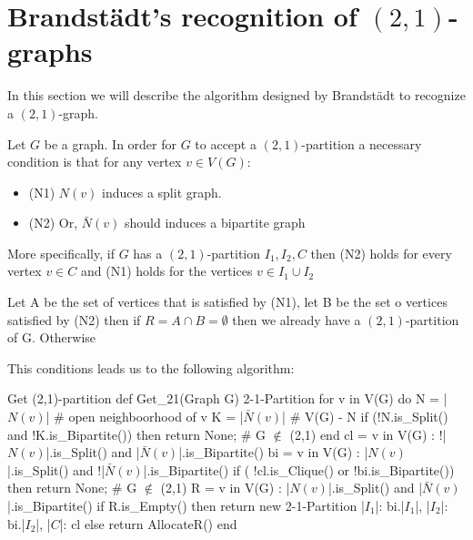 \section{Brandstädt's recognition of $(2,1)$-graphs}

In this section we will describe the algorithm designed by Brandstädt to recognize a $(2,1)$-graph.

Let $G$ be a graph. In order for $G$ to accept a $(2,1)$-partition a necessary condition is that for any vertex $v \in V(G)$:

\begin{itemize}
\item (N1) $N(v)$ induces a split graph.
\item (N2) Or, $\bar{N}(v)$ should induces a bipartite graph
\end{itemize}

More specifically, if $G$ has a $(2,1)$-partition $I_1,I_2,C$ then (N2) holds for every vertex $v \in C$ and (N1) holds for the vertices $v \in I_1 \cup I_2$

Let A be the set of vertices that is satisfied by (N1), let B be the set o vertices satisfied by (N2) then if $R=A \cap B=\emptyset$ then we already have a $(2,1)$-partition of G. Otherwise 



This conditions leads us to the following algorithm:


\begin{code}{Get (2,1)-partition}
  def Get_21(Graph G) 2-1-Partition
    for v in V(G) do
      N = |$N(v)$| # open neighboorhood of v
      K = |$\bar{N}(v)$| # V(G) - N
      if (!N.is_Split() and !K.is_Bipartite()) then
        return None; # G $\notin$ (2,1)
    end
    cl = { v in V(G) : !|$N(v)$|.is_Split() and |$\bar{N}(v)$|.is_Bipartite() }
    bi = { v in V(G) : |$N(v)$|.is_Split() and !|$\bar{N}(v)$|.is_Bipartite() }
    if ( !cl.is_Clique() or !bi.is_Bipartite()) then
      return None; # G $\notin$ (2,1)
    R = {v in V(G) : |$N(v)$|.is_Split() and |$\bar{N}(v)$|.is_Bipartite()}
    if R.is_Empty() then
      return new 2-1-Partition {
        |$I_1$|: bi.|$I_1$|,
        |$I_2$|: bi.|$I_2$|,
        |$C$|: cl
      }
    else return AllocateR()
  end
\end{code}

